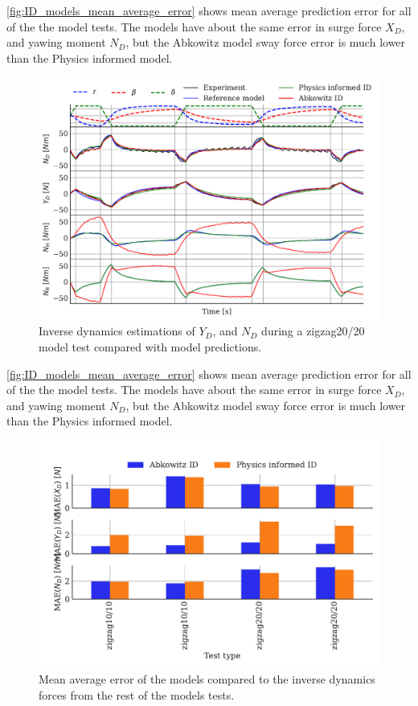 \autoref{fig:ID_models_mean_average_error} shows mean average prediction error for all of the the model tests. The models have about the same error in surge force $X_D$, and yawing moment $N_D$, but the Abkowitz model sway force error is much lower than the Physics informed model. 
\begin{figure}[h]
    \centering
    \includegraphics[width=\columnwidth]{figures/results.ID_zigzag20.pdf}
    \caption{Inverse dynamics estimations of $Y_D$, and $N_D$ during a zigzag20/20 model test compared with model predictions.}
    \label{fig:ID_regression_ID_N}
\end{figure}
\autoref{fig:ID_models_mean_average_error} shows mean average prediction error for all of the the model tests. The models have about the same error in surge force $X_D$, and yawing moment $N_D$, but the Abkowitz model sway force error is much lower than the Physics informed model. 
\begin{figure}[h]
    \begin{center}
        \includegraphics[width=\columnwidth]{figures/result_ID_regression.ID_models_mean_average_error.pdf}
        \caption{Mean average error of the models compared to the inverse dynamics
forces from the rest of the models tests.}
        \label{fig:ID_models_mean_average_error}
    \end{center}
\end{figure}

